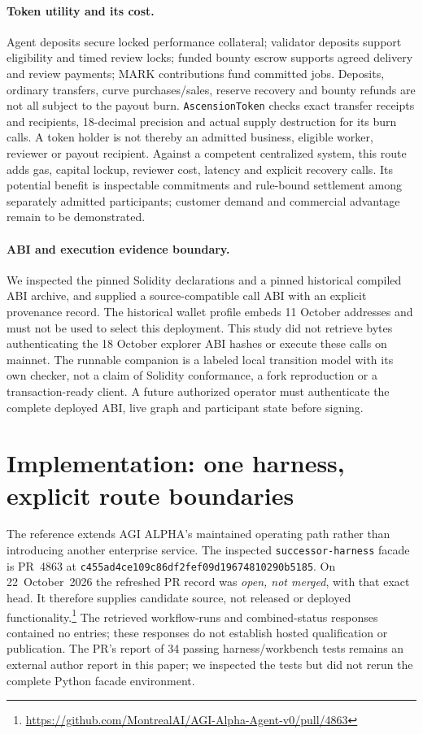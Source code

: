 \documentclass[11pt,letterpaper]{article}
\begin{document}
\paragraph{Token utility and its cost.}
Agent deposits secure locked performance collateral; validator deposits support eligibility and timed review locks; funded bounty escrow supports agreed delivery and review payments; MARK contributions fund committed jobs. Deposits, ordinary transfers, curve purchases/sales, reserve recovery and bounty refunds are not all subject to the payout burn. \texttt{AscensionToken} checks exact transfer receipts and recipients, 18-decimal precision and actual supply destruction for its burn calls. A token holder is not thereby an admitted business, eligible worker, reviewer or payout recipient. Against a competent centralized system, this route adds gas, capital lockup, reviewer cost, latency and explicit recovery calls. Its potential benefit is inspectable commitments and rule-bound settlement among separately admitted participants; customer demand and commercial advantage remain to be demonstrated.

\paragraph{ABI and execution evidence boundary.}
We inspected the pinned Solidity declarations and a pinned historical compiled ABI archive, and supplied a source-compatible call ABI with an explicit provenance record. The historical wallet profile embeds 11 October addresses and must not be used to select this deployment. This study did not retrieve bytes authenticating the 18 October explorer ABI hashes or execute these calls on mainnet. The runnable companion is a labeled local transition model with its own checker, not a claim of Solidity conformance, a fork reproduction or a transaction-ready client. A future authorized operator must authenticate the complete deployed ABI, live graph and participant state before signing.


\FloatBarrier
\section{Implementation: one harness, explicit route boundaries}\label{sec:harness}

The reference extends AGI ALPHA's maintained operating path rather than introducing another enterprise service. The inspected \texttt{successor-\allowbreak{}harness} facade is PR~4863 at
\texttt{c455ad4c\allowbreak{}e109c86d\allowbreak{}f2fef09d\allowbreak{}19674810\allowbreak{}290b5185}. On 22~October~2026 the refreshed PR record was \emph{open, not merged}, with that exact head. It therefore supplies candidate source, not released or deployed functionality.\footnote{\url{https://github.com/MontrealAI/AGI-Alpha-Agent-v0/pull/4863}}
The retrieved workflow-runs and combined-status responses contained no entries; these responses do not establish hosted qualification or publication. The PR's report of 34 passing harness/workbench tests remains an external author report in this paper; we inspected the tests but did not rerun the complete Python facade environment.
\end{document}
